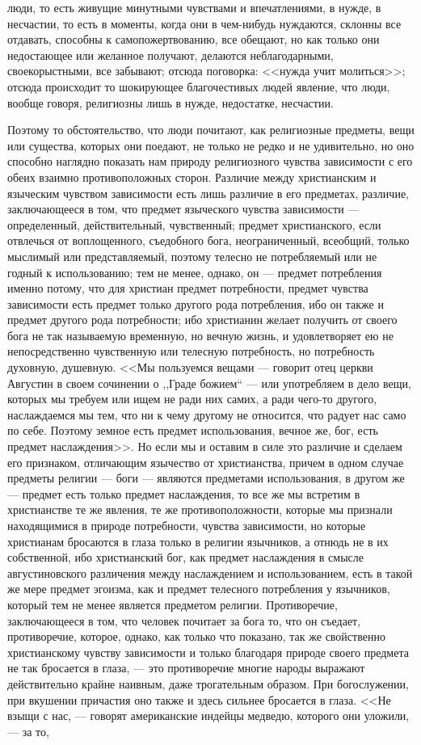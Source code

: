 \documentclass[12pt]{article}
\begin{document}
люди, то есть живущие минутными чувствами и впечатлениями, в нужде, в несчастии, то есть в моменты, когда они в чем-нибудь нуждаются, склонны все отдавать, способны к самопожертвованию, все обещают, но как только они недостающее или желанное получают, делаются неблагодарными, своекорыстными, все забывают; отсюда поговорка: <<нужда учит молиться>>; отсюда происходит то шокирующее благочестивых людей явление, что люди, вообще говоря, религиозны лишь в нужде, недостатке, несчастии. 

Поэтому то обстоятельство, что люди почитают, как религиозные предметы, вещи или существа, которых они поедают, не только не редко и не удивительно, но оно способно наглядно показать нам природу религиозного чувства зависимости с его обеих взаимно противоположных сторон. Различие между христианским и языческим чувством зависимости есть лишь различие в его предметах, различие, заключающееся в том, что предмет языческого чувства зависимости --- определенный, действительный, чувственный; предмет христианского, если отвлечься от воплощенного, съедобного бога, неограниченный, всеобщий, только мыслимый или представляемый, поэтому телесно не потребляемый или не годный к использованию; тем не менее, однако, он --- предмет потребления именно потому, что для христиан предмет потребности, предмет чувства зависимости есть предмет только другого рода потребления, ибо он также и предмет другого рода потребности; ибо христианин желает получить от своего бога не так называемую временную, но вечную жизнь, и удовлетворяет ею не непосредственно чувственную или телесную потребность, но потребность духовную, душевную. <<Мы пользуемся вещами --- говорит отец церкви Августин в своем сочинении о ,,Граде божием``  --- или употребляем в дело вещи, которых мы требуем или ищем не ради них самих, а ради чего-то другого, наслаждаемся мы тем, что ни к чему другому не относится, что радует нас само по себе. Поэтому земное есть предмет использования, вечное же, бог, есть предмет наслаждения>>. Но если мы и оставим в силе это различие и сделаем его признаком, отличающим язычество от христианства, причем в одном случае предметы религии --- боги --- являются предметами использования, в другом же --- предмет есть только предмет наслаждения, то все же мы встретим в христианстве те же явления, те же противоположности, которые мы признали находящимися в природе потребности, чувства зависимости, но которые христианам бросаются в глаза только в религии язычников, а отнюдь не в их собственной, ибо христианский бог, как предмет наслаждения в смысле августиновского различения между наслаждением и использованием, есть в такой же мере предмет эгоизма, как и предмет телесного потребления у язычников, который тем не менее является предметом религии. Противоречие, заключающееся в том, что человек почитает за бога то, что он съедает, противоречие, которое, однако, как только что показано, так же свойственно христианскому чувству зависимости и только благодаря природе своего предмета не так бросается в глаза, --- это противоречие многие народы выражают действительно крайне наивным, даже трогательным образом. При богослужении, при вкушении причастия оно также и здесь сильнее бросается в глаза. <<Не взыщи с нас, --- говорят американские индейцы медведю, которого они уложили, --- за то, 
\end{document}
